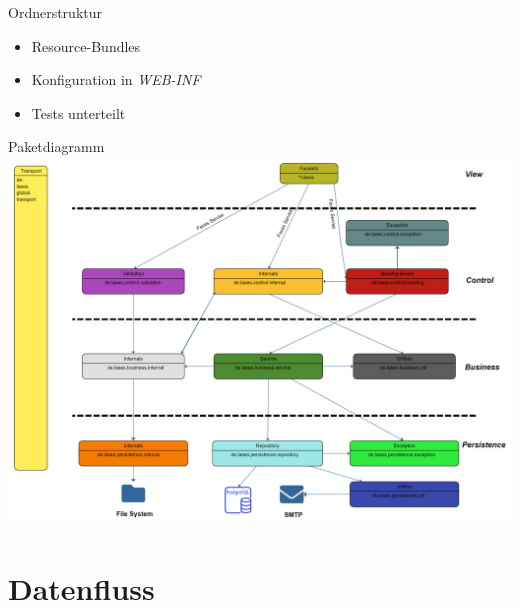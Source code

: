 \documentclass{beamer}
\begin{document}
\begin{frame}{Ordnerstruktur}
        \begin{itemize}
            \item Resource-Bundles
            \pause
            \item Konfiguration in \emph{WEB-INF}
            \pause
            \item Tests unterteilt
        \end{itemize}
    \end{frame}


    \begin{frame}{Paketdiagramm}
        \centering
        \includegraphics[height=0.8\textheight]{graphics/Paketdiagramm (15)}
    \end{frame}


    \section{Datenfluss}
\end{document}
